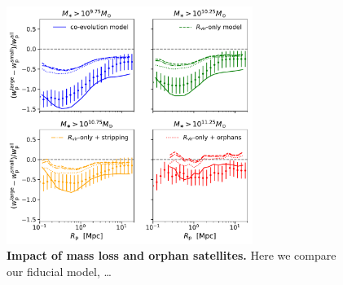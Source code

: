 \documentclass[usenatbib,usegraphicx,letterpaper]{mn2e}
\newcommand{\rhalf}{R_{1/2}}
\newcommand{\mvir}{M_{\rm vir}}
\newcommand{\macc}{M_{\rm acc}}
\newcommand{\rvir}{R_{\rm vir}}
\newcommand{\rproj}{r_{\rm p}}
\newcommand{\wproj}{w_{\rm p}}
\begin{document}




\begin{figure}
\centering
\includegraphics[width=8cm]{FIGS/penultimate_clustering_ratios_alternate_models.pdf}
\caption{
{\bf Impact of mass loss and orphan satellites.}
Here we compare our fiducial model, \dots 
}
\label{fig:shuffle}
\end{figure}
\end{document}
